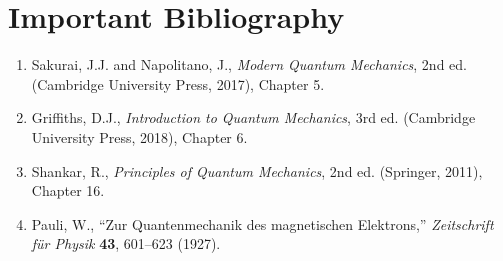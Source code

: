 \section*{Important Bibliography}

\begin{enumerate}
\item Sakurai, J.J. and Napolitano, J., \textit{Modern Quantum Mechanics}, 2nd ed. (Cambridge University Press, 2017), Chapter 5.
\item Griffiths, D.J., \textit{Introduction to Quantum Mechanics}, 3rd ed. (Cambridge University Press, 2018), Chapter 6.
\item Shankar, R., \textit{Principles of Quantum Mechanics}, 2nd ed. (Springer, 2011), Chapter 16.
\item Pauli, W., ``Zur Quantenmechanik des magnetischen Elektrons,'' \textit{Zeitschrift f\"ur Physik} \textbf{43}, 601--623 (1927).
\end{enumerate}


